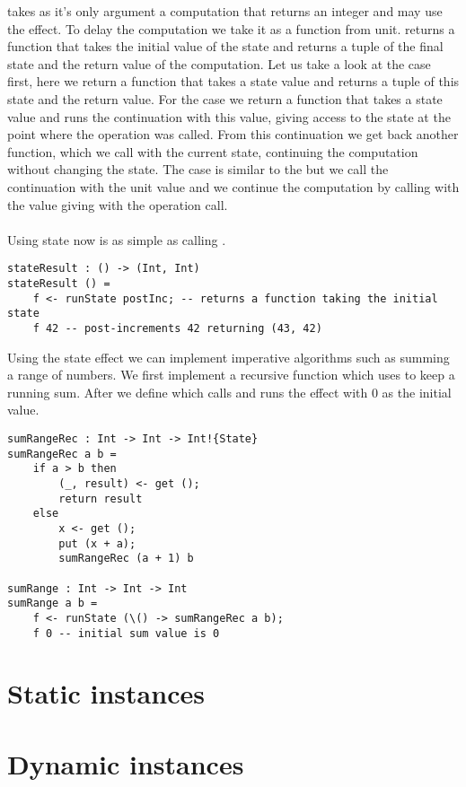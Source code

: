 { takes as it's only argument a computation that returns an integer and may use the  effect.
To delay the computation we take it as a function from unit.
 returns a function that takes the initial value of the state and returns a tuple of the final state and the return value of the computation.
Let us take a look at the  case first, here we return a function that takes a state value and returns a tuple of this state and the return value.
For the  case we return a function that takes a state value and runs the continuation  with this value, giving access to the state at the point where the  operation was called. From this continuation we get back another function, which we call with the current state, continuing the computation without changing the state.
The  case is similar to the  but we call the continuation with the unit value and we continue the computation by calling  with the value giving with the  operation call.
\\\\
Using state now is as simple as calling .

\begin{verbatim}
stateResult : () -> (Int, Int)
stateResult () =
	f <- runState postInc; -- returns a function taking the initial state
	f 42 -- post-increments 42 returning (43, 42)
\end{verbatim}

Using the state effect we can implement imperative algorithms such as summing a range of numbers.
We first implement a recursive function  which uses  to keep a running sum.
After we define  which calls  and runs the  effect with $0$ as the initial value.

\begin{verbatim}
sumRangeRec : Int -> Int -> Int!{State}
sumRangeRec a b =
	if a > b then
		(_, result) <- get ();
		return result
	else
		x <- get ();
		put (x + a);
		sumRangeRec (a + 1) b
		
sumRange : Int -> Int -> Int
sumRange a b =
	f <- runState (\() -> sumRangeRec a b);
	f 0 -- initial sum value is 0
\end{verbatim}

\section{Static instances} \label{section:background-staticinst}


\section{Dynamic instances} \label{section:background-dynamicinst}




}